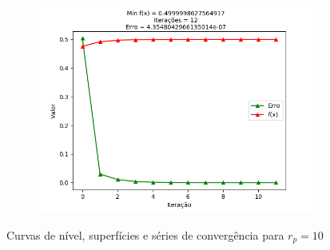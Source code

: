 \documentclass[a4paper, 12pt]{article}
\begin{document}
\begin{figure}[H]
\begin{subfigure}{0.3\textwidth}
  \includegraphics[width=\linewidth]{1/A/RP10/convergencia.png}
\end{subfigure}
\caption{Curvas de nível, superfícies e séries de convergência para $r_p = 10$}
\label{fig:Q1ARP10}
\end{figure}
\end{document}
